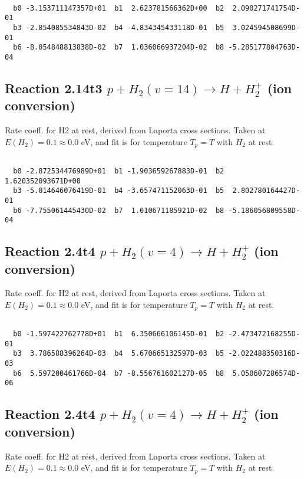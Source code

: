 \begin{small}\begin{verbatim}

  b0 -3.153711147357D+01  b1  2.623781566362D+00  b2  2.090271741754D-01
  b3 -2.854085534843D-02  b4 -4.834345433118D-01  b5  3.024594508699D-01
  b6 -8.054848813838D-02  b7  1.036066937204D-02  b8 -5.285177804763D-04

\end{verbatim}\end{small}

\newpage
\subsection{
Reaction 2.14t3
$ p + H_2(v=14) \rightarrow H + H_2^+$ (ion conversion)
}
Rate coeff. for H2 at rest, derived from Laporta cross sections.
Taken at $E(H_2) = 0.1 \approx 0.0$ eV,  and fit is for temperature $T_p=T$ with $H_2$ at rest.

\begin{small}\begin{verbatim}

  b0 -2.872534476989D+01  b1 -1.903659267883D-01  b2  1.620352093671D+00
  b3 -5.014646076419D-01  b4 -3.657471152063D-01  b5  2.802780164427D-01
  b6 -7.755061445430D-02  b7  1.010671185921D-02  b8 -5.186056809558D-04

\end{verbatim}\end{small}

\newpage
\subsection{
Reaction 2.4t4
$ p + H_2(v=4) \rightarrow H + H_2^+$ (ion conversion)
}
Rate coeff. for H2 at rest, derived from Laporta cross sections.
Taken at $E(H_2) = 0.1 \approx 0.0$ eV,  and fit is for temperature $T_p=T$ with $H_2$ at rest.

\begin{small}\begin{verbatim}

  b0 -1.597422762778D+01  b1  6.350666106145D-01  b2 -2.473472168255D-01
  b3  3.786588396264D-03  b4  5.670665132597D-03  b5 -2.022488350316D-03
  b6  5.597200461766D-04  b7 -8.556761602127D-05  b8  5.050607286574D-06

\end{verbatim}\end{small}

\newpage
\subsection{
Reaction 2.4t4
$ p + H_2(v=4) \rightarrow H + H_2^+$ (ion conversion)
}
Rate coeff. for H2 at rest, derived from Laporta cross sections.
Taken at $E(H_2) = 0.1 \approx 0.0$ eV,  and fit is for temperature $T_p=T$ with $H_2$ at rest.

